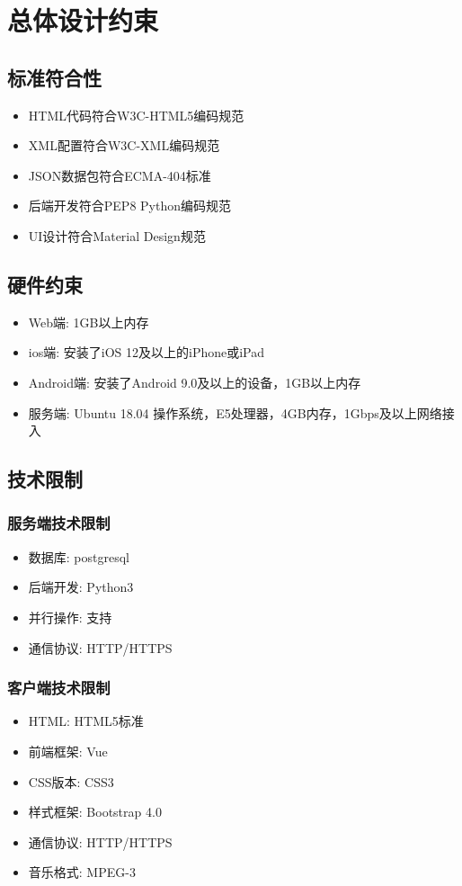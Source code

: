 \chapter{总体设计约束}


\section{标准符合性}


\begin{itemize}
	\item HTML代码符合W3C-HTML5编码规范
	\item XML配置符合W3C-XML编码规范 
	\item JSON数据包符合ECMA-404标准 
	\item 后端开发符合PEP8 Python编码规范 
	\item UI设计符合Material Design规范
\end{itemize}


\section{硬件约束}

\begin{itemize}
	\item Web端: 1GB以上内存
	\item ios端: 安装了iOS 12及以上的iPhone或iPad
	\item Android端: 安装了Android 9.0及以上的设备，1GB以上内存
	\item 服务端: Ubuntu 18.04 操作系统，E5处理器，4GB内存，1Gbps及以上网络接入
\end{itemize}


\section{技术限制}

\subsection{服务端技术限制}

\begin{itemize}
	\item 数据库: postgresql
	\item 后端开发: Python3
	\item 并行操作: 支持
	\item 通信协议: HTTP/HTTPS
\end{itemize}

\subsection{客户端技术限制}

\begin{itemize}
	\item HTML: HTML5标准
	\item 前端框架: Vue
	\item CSS版本: CSS3
	\item 样式框架: Bootstrap 4.0
	\item 通信协议: HTTP/HTTPS
	\item 音乐格式: MPEG-3
\end{itemize}

